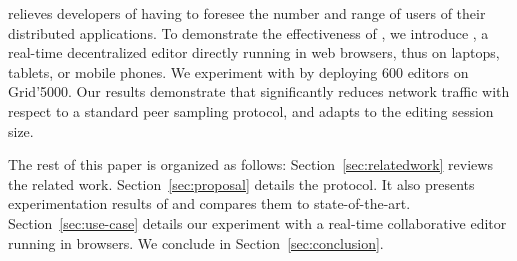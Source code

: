 \SPRAY relieves developers of having to foresee the number and range of users of
their distributed applications.  To demonstrate the effectiveness of \SPRAY, we
introduce \CRATE, a real-time decentralized editor directly running in web
browsers, thus on laptops, tablets, or mobile phones. We experiment with \CRATE
by deploying 600 editors on Grid'5000. Our results demonstrate that \SPRAY
significantly reduces network traffic with respect to a standard peer sampling
protocol, and adapts to the editing session size.

The rest of this paper is organized as follows: Section~\ref{sec:relatedwork}
reviews the related work. Section~\ref{sec:proposal} details the \SPRAY
protocol. It also presents experimentation results of \SPRAY and compares them
to state-of-the-art. Section~\ref{sec:use-case} details our experiment with
\CRATE a real-time collaborative editor running in browsers. We conclude in
Section~\ref{sec:conclusion}.

